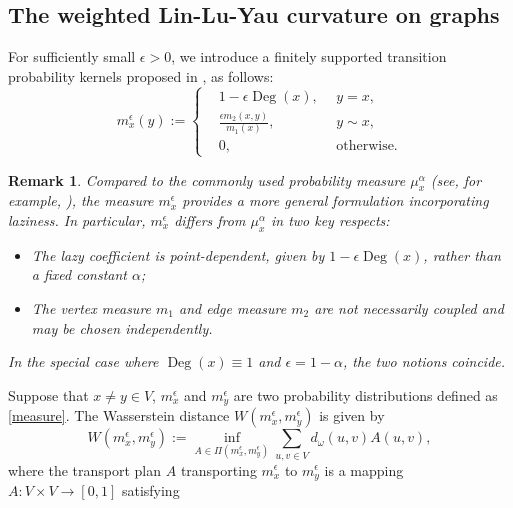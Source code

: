 \documentclass{article}
\newtheorem{remark}{Remark}
\begin{document}
\subsection{The weighted Lin-Lu-Yau curvature on graphs}
For sufficiently small $\epsilon > 0$, we introduce a finitely supported transition probability kernels proposed in \cite{MW}, as follows:
\begin{equation}\label{measure}
m_x^\epsilon(y):=\left\{\begin{aligned}
    &1-\epsilon \operatorname{Deg}(x),&~~ y=x,\\
    &\frac{\epsilon m_2(x,y)}{m_1(x)},&~~y\sim x,\\
    &0,&~~\mbox{otherwise.}
\end{aligned}
  \right.
\end{equation}

 
  \begin{remark} 
Compared to the commonly used probability measure $\mu_x^{\alpha}$ (see, for example, \cite{bailin,LLY11}),
the measure $m_x^\epsilon$ provides a more general formulation incorporating laziness. 
In particular, $m_x^\epsilon$ differs from $\mu_x^{\alpha}$ in two key respects:
\begin{itemize}
    \item The \emph{lazy coefficient} is point-dependent, given by 
    $1 - \epsilon \operatorname{Deg}(x)$, rather than a fixed constant $\alpha$;
   \item The vertex measure $m_1$ and edge measure $m_2$ are not necessarily coupled
 and may be chosen independently.
\end{itemize}
In the special case where $\operatorname{Deg}(x) \equiv 1$ and $\epsilon = 1-\alpha$, 
the two notions coincide.
\end{remark}

Suppose that \( x\neq y\in V \), \( m_x^\epsilon \) and \( m_y^\epsilon \) are two probability distributions defined as \eqref{measure}. The Wasserstein distance $W(m_x^\epsilon,m_y^\epsilon)$ is given by 
\[W(m_x^\epsilon,m_y^\epsilon):=\inf_{A \in \Pi(m_x^\epsilon, m_y^\epsilon)} \sum_{u,v \in V} d_{\omega}(u,v) A(u,v),\]
where the transport plan \( A \) transporting \( m_x^\epsilon \) to \( m_y^\epsilon \) is a mapping \( A : V \times V \to [0, 1] \) satisfying
\end{document}
